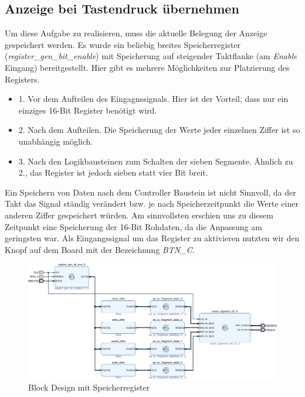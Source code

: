 \documentclass[11pt, a4paper]{article}
\begin{document}
\subsection*{Anzeige bei Tastendruck übernehmen}
Um diese Aufgabe zu realisieren, muss die aktuelle Belegung der Anzeige gespeichert werden. Es wurde ein beliebig breites Speicherregister (\textit{register\_gen\_bit\_enable}) mit Speicherung auf steigender Taktflanke (am \textit{Enable} Eingang) bereitgestellt. Hier gibt es mehrere Möglichkeiten zur Platzierung des Registers.
\begin{itemize}
	\item 1. Vor dem Aufteilen des Eingagnssignals. Hier ist der Vorteil, dass nur ein einziges 16-Bit Register benötigt wird.
	\item 2. Nach dem Aufteilen. Die Speicherung der Werte jeder einzelnen Ziffer ist so unabhängig möglich.
	\item 3. Nach den Logikbausteinen zum Schalten der sieben Segmente. Ähnlich zu 2., das Register ist jedoch sieben statt vier Bit breit.
\end{itemize}
Ein Speichern von Daten nach dem Controller Baustein ist nicht Sinnvoll, da der Takt das Signal ständig verändert bzw. je nach Speicherzeitpunkt die Werte einer anderen Ziffer gespeichert würden.
Am sinnvollsten erschien uns zu diesem Zeitpunkt eine Speicherung der 16-Bit Rohdaten, da die Anpassung am geringsten war. Als Eingangssignal um das Register zu aktivieren nutzten wir den Knopf auf dem Board mit der Bezeichnung \textit{BTN\_C}.
\begin{figure}[H]    
    \centering
    \includegraphics[width=\linewidth]{versuch4Data/hierarchical_display_trigger.pdf}
    \caption{Block Design mit Speicherregister}
    \label{aufbauTrigger}        
\end{figure}
\end{document}
